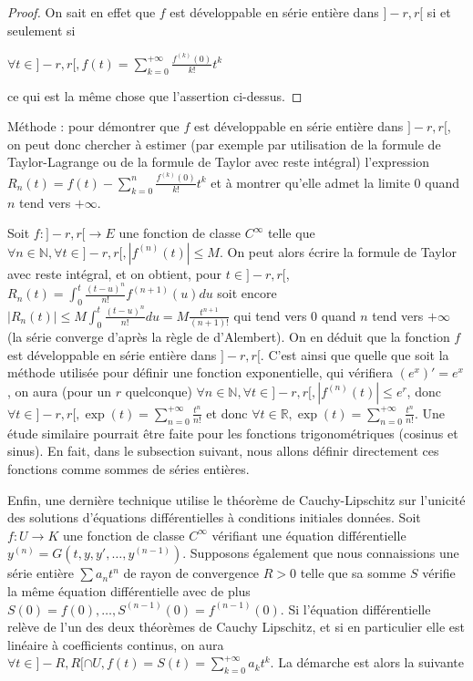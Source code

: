 \begin{proof}
On sait en effet que $f$ est développable en série entière dans $]-r,r[$ si et seulement si

$\forall t \in ]-r,r[, f(t) = \sum_{k=0}^{+\infty} \frac{f^{(k)}(0)}{k!} t^k$

ce qui est la même chose que l'assertion ci-dessus.
\end{proof}

Méthode : pour démontrer que $f$ est développable en série entière dans $]-r,r[$, on peut donc chercher à estimer (par exemple par utilisation de la formule de Taylor-Lagrange ou de la formule de Taylor avec reste intégral) l'expression $R_n(t) = f(t) - \sum_{k=0}^n \frac{f^{(k)}(0)}{k!} t^k$ et à montrer qu'elle admet la limite 0 quand $n$ tend vers $+\infty$.

\begin{ex}
Soit $f : ]-r,r[ \rightarrow E$ une fonction de classe $C^\infty$ telle que $\forall n \in \mathbb{N}, \forall t \in ]-r,r[, |f^{(n)}(t)| \leq M$. On peut alors écrire la formule de Taylor avec reste intégral, et on obtient, pour $t \in ]-r,r[$, $R_n(t) = \int_0^t \frac{(t-u)^n}{n!} f^{(n+1)}(u) du$ soit encore $|R_n(t)| \leq M \int_0^t \frac{(t-u)^n}{n!} du = M \frac{t^{n+1}}{(n+1)!}$ qui tend vers 0 quand $n$ tend vers $+\infty$ (la série converge d'après la règle de d'Alembert). On en déduit que la fonction $f$ est développable en série entière dans $]-r,r[$. C'est ainsi que quelle que soit la méthode utilisée pour définir une fonction exponentielle, qui vérifiera $(e^x)' = e^x$, on aura (pour un $r$ quelconque) $\forall n \in \mathbb{N}, \forall t \in ]-r,r[, |f^{(n)}(t)| \leq e^r$, donc $\forall t \in ]-r,r[, \exp(t) = \sum_{n=0}^{+\infty} \frac{t^n}{n!}$ et donc $\forall t \in \mathbb{R}, \exp(t) = \sum_{n=0}^{+\infty} \frac{t^n}{n!}$. Une étude similaire pourrait être faite pour les fonctions trigonométriques (cosinus et sinus). En fait, dans le subsection suivant, nous allons définir directement ces fonctions comme sommes de séries entières.
\end{ex}

Enfin, une dernière technique utilise le théorème de Cauchy-Lipschitz sur l'unicité des solutions d'équations différentielles à conditions initiales données. Soit $f : U \rightarrow K$ une fonction de classe $C^\infty$ vérifiant une équation différentielle $y^{(n)} = G(t,y,y',\ldots,y^{(n-1)})$. Supposons également que nous connaissions une série entière $\sum a_n t^n$ de rayon de convergence $R > 0$ telle que sa somme $S$ vérifie la même équation différentielle avec de plus $S(0) = f(0), \ldots, S^{(n-1)}(0) = f^{(n-1)}(0)$. Si l'équation différentielle relève de l'un des deux théorèmes de Cauchy Lipschitz, et si en particulier elle est linéaire à coefficients continus, on aura $\forall t \in ]-R,R[ \cap U, f(t) = S(t) = \sum_{k=0}^{+\infty} a_k t^k$. La démarche est alors la suivante

